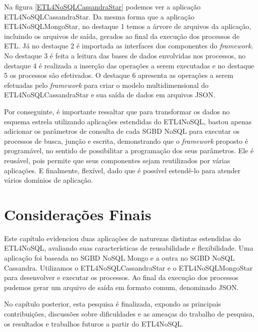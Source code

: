 Na figura \ref{ETL4NoSQLCassandraStar} podemos ver a aplicação ETL4NoSQLCassandraStar. Da mesma forma que a aplicação ETL4NoSQLMongoStar, no destaque 1 temos a árvore de arquivos da aplicação, incluindo os arquivos de saída, gerados ao final da execução dos processos de ETL. Já no destaque 2 é importada as interfaces dos componentes do \textit{framework}. No destaque 3 é feita a leitura das bases de dados envolvidas nos processos, no destaque 4 é realizada a inserção das operações a serem executadas e no destaque 5 os processos são efetivados. O destaque 6 apresenta as operações a serem efetuadas pelo \textit{framework} para criar o modelo multidimensional do ETL4NoSQLCassandraStar e sua saída de dados em arquivos JSON.

Por conseguinte, é importante ressaltar que para transformar os dados no esquema estrela utilizando aplicações estendidas do ETL4NoSQL, bastou apenas adicionar os parâmetros de consulta de cada SGBD NoSQL para executar os processos de busca, junção e escrita, demonstrando que o \textit{framework} proposto é programável, no sentido de possibilitar a programação dos seus parâmetros. Ele é reusável, pois permite que seus componentes sejam reutilizados por várias aplicações. E finalmente, flexível, dado que é possível estendê-lo para atender vários domínios de aplicação. 

  
\section{Considerações Finais}

Este capítulo evidenciou duas aplicações de naturezas distintas estendidas do ETL4NoSQL, avaliando suas características de reusabilidade e flexibilidade. Uma aplicação foi baseada no SGBD NoSQL Mongo e a outra no SGBD NoSQL Cassandra. Utilizamos o ETL4NoSQLCassandraStar e o ETL4NoSQLMongoStar para desenvolver e executar os processos. Ao final da execução dos processos pudemos gerar um arquivo de saída em formato comum, denominado JSON. 

No capítulo posterior, esta pesquisa é finalizada, expondo as principais contribuições, discussões sobre dificuldades e as ameaças do trabalho de pesquisa, os resultados e trabalhos futuros a partir do ETL4NoSQL.
